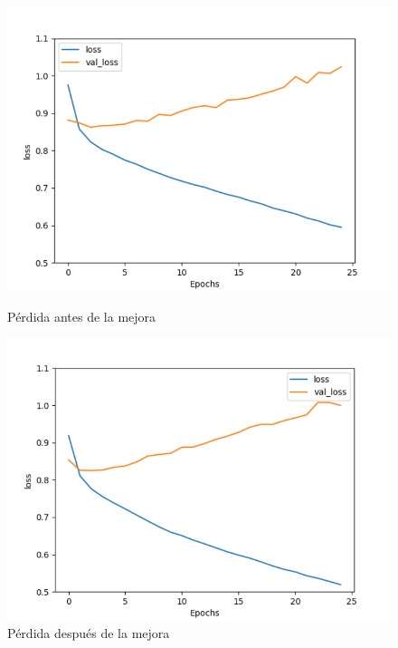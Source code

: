 \documentclass[a4]{sciposter}
\begin{document}
\begin{multicols}{3}
\begin{figure}[!tbp]
  \centering
  \begin{minipage}[b]{0.45\textwidth}
    \includegraphics[width=1.05\textwidth]{img/Loss Before.png}
    \caption{Pérdida antes de la mejora}
  \end{minipage}
  \hfill
  \begin{minipage}[b]{0.45\textwidth}
    \includegraphics[width=1.05\textwidth]{img/Loss After.png}
    \caption{Pérdida después de la mejora}
  \end{minipage}
  
\end{figure}




\end{multicols}
\end{document}
